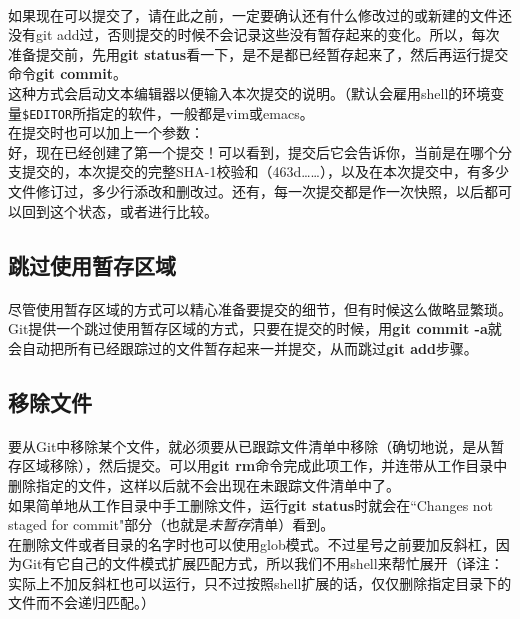 \documentclass{book}
\begin{document}
	\paragraph{}
	如果现在可以提交了，请在此之前，一定要确认还有什么修改过的或新建的文件还没有git add过，否则提交的时候不会记录这些没有暂存起来的变化。所以，每次准备提交前，先用\textbf{git status}看一下，是不是都已经暂存起来了，然后再运行提交命令\textbf{git commit}。\\
	这种方式会启动文本编辑器以便输入本次提交的说明。（默认会雇用shell的环境变量\verb|$EDITOR|所指定的软件，一般都是vim或emacs。\\
	在提交时也可以加上一个参数：\\
	好，现在已经创建了第一个提交！可以看到，提交后它会告诉你，当前是在哪个分支提交的，本次提交的完整SHA-1校验和（463d……），以及在本次提交中，有多少文件修订过，多少行添改和删改过。还有，每一次提交都是作一次快照，以后都可以回到这个状态，或者进行比较。\\
	\subsection{跳过使用暂存区域}
	\paragraph{}
	尽管使用暂存区域的方式可以精心准备要提交的细节，但有时候这么做略显繁琐。Git提供一个跳过使用暂存区域的方式，只要在提交的时候，用\textbf{git commit -a}就会自动把所有已经跟踪过的文件暂存起来一并提交，从而跳过\textbf{git add}步骤。\\
	\subsection{移除文件}
	\paragraph{}
	要从Git中移除某个文件，就必须要从已跟踪文件清单中移除（确切地说，是从暂存区域移除），然后提交。可以用\textbf{git rm}命令完成此项工作，并连带从工作目录中删除指定的文件，这样以后就不会出现在未跟踪文件清单中了。\\
	如果简单地从工作目录中手工删除文件，运行\textbf{git status}时就会在``Changes not staged for commit"部分（也就是\textit{未暂存}清单）看到。\\
	在删除文件或者目录的名字时也可以使用glob模式。不过星号之前要加反斜杠，因为Git有它自己的文件模式扩展匹配方式，所以我们不用shell来帮忙展开（译注：实际上不加反斜杠也可以运行，只不过按照shell扩展的话，仅仅删除指定目录下的文件而不会递归匹配。）\\
\end{document}
